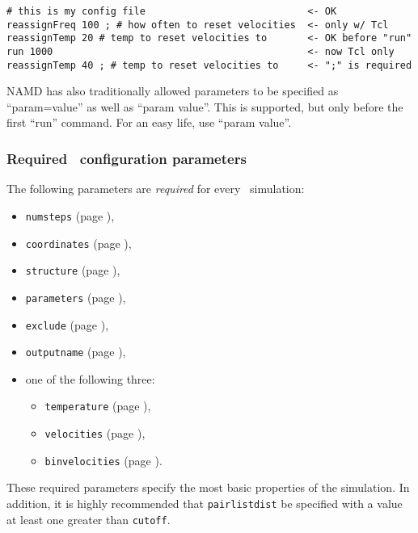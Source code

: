 \begin{verbatim}
# this is my config file                            <- OK
reassignFreq 100 ; # how often to reset velocities  <- only w/ Tcl
reassignTemp 20 # temp to reset velocities to       <- OK before "run"
run 1000                                            <- now Tcl only
reassignTemp 40 ; # temp to reset velocities to     <- ";" is required
\end{verbatim}

NAMD has also traditionally allowed parameters to be specified as
``param=value'' as well as ``param value''.  This is supported, but only
before the first ``run'' command.  For an easy life, use ``param value''.

\subsubsection{Required \NAMD\ configuration parameters}
\label{section:requiredparams}

The following parameters are {\em required} for every
\NAMD\ simulation:

\begin{itemize}

\item
{\tt numsteps} (page \pageref{param:numsteps}),

\item
{\tt coordinates} (page \pageref{param:coordinates}),

\item
{\tt structure} (page \pageref{param:structure}),

\item
{\tt parameters} (page \pageref{param:parameters}),

\item
{\tt exclude} (page \pageref{param:exclude}), 

\item
{\tt outputname} (page \pageref{param:outputname}), 

\item
one of the following three:
\begin{itemize}
\item
{\tt temperature} (page \pageref{param:temperature}),

\item
{\tt velocities} (page \pageref{param:velocities}),

\item
{\tt binvelocities} (page \pageref{param:binvelocities}).
\end{itemize}

\end{itemize}

\noindent These required parameters specify the most basic properties of
the simulation.  %
In addition, it is highly recommended that 
{\tt pairlistdist} be specified with a 
value at least one greater than {\tt cutoff}.

